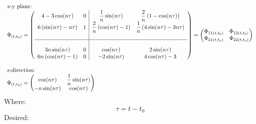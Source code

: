 \documentclass[11pt, a4paper]{article}
\begin{document}
\begin{equation}
    \begin{array}{l}
        \text{x-y plane:} \\
        \Phi_{(t,t_0)} = \left(\begin{array}{cc|cc}
            4-3\cos(n\tau) & 0 &\displaystyle \frac{1}{n}\sin(n\tau) &\displaystyle \frac{2}{n}\left(1-\cos(n\tau)\right) \\ 
            6\left(\sin(n\tau)-n\tau\right) & 1 &\displaystyle \frac{2}{n}\left(\cos(n\tau)-1\right) &\displaystyle \frac{1}{n}\left(4\sin(n\tau)-3n\tau\right)\\ &&& \\ \hline &&& \\
            3n\sin(n\tau) & 0 & \cos(n\tau) & 2\sin(n\tau) \\
            6n\left(\cos(n\tau)-1\right) & 0 & -2\sin(n\tau) & 4\cos(n\tau)-3 
        \end{array}\right) = \begin{pmatrix}
            \Phi_{11(t,t_0)} & \Phi_{12(t,t_0)} \\
            \Phi_{21(t,t_0)} & \Phi_{22(t,t_0)}
        \end{pmatrix} \\ \\ 
    \text{z-direction:} \\
    \Phi_{(t,t_0)} = \begin{pmatrix}
        \cos(n\tau) & \displaystyle\frac{1}{n}\sin(n\tau) \\
        -n\sin(n\tau) & \cos(n\tau)
    \end{pmatrix}
    \end{array}
\end{equation}
Where:
\begin{equation*}
    \tau = t-t_0
\end{equation*}
Desired:
\end{document}
